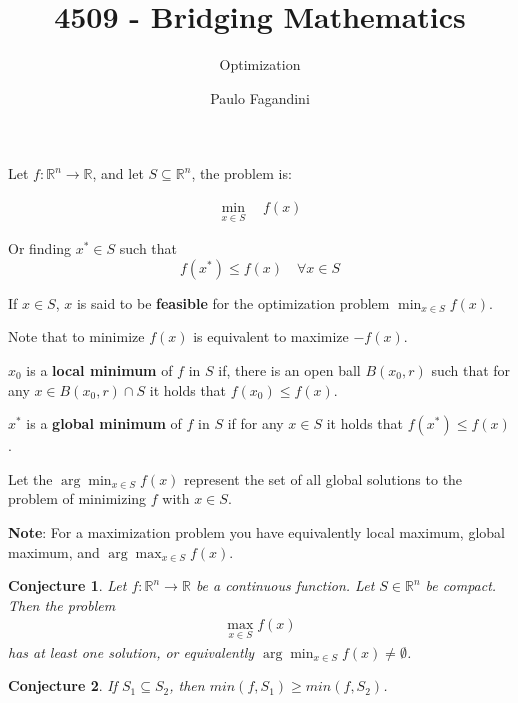 \documentclass[aspectratio=169]{beamer}
\title[]{4509 - Bridging Mathematics}
\subtitle{Optimization}
\author{Paulo Fagandini}
\institute{}
\date{}
\newtheorem{proposition}{Conjecture}[section]
\begin{document}
\begin{frame}
    Let $f:\mathds{R}^n\rightarrow\mathds{R}$, and let $S\subseteq\mathds{R}^n$, the problem is:
    
    \begin{align*}
        \min_{x\in S} \quad f(x)
    \end{align*}
    
    Or finding $x^*\in S$ such that $$f(x^*)\leq f(x) \quad \forall x\in S$$
    
    \begin{definition}
        If $x\in S$, $x$ is said to be \textbf{feasible} for the optimization problem $\min_{x\in S}f(x)$.
    \end{definition}
    \vspace{0.5cm}
    \footnotesize{
    Note that to minimize $f(x)$ is equivalent to maximize $-f(x)$.}
\end{frame}

\begin{frame}
    \begin{definition}
        $x_0$ is a \textbf{local minimum} of $f$ in $S$ if, there is an open ball $B(x_0,r)$ such that for any $x\in B(x_0,r)\cap S$ it holds that $f(x_0)\leq f(x)$.
        
        \vspace{0.25cm}
        
        $x^*$ is a \textbf{global minimum} of $f$ in $S$ if for any $x\in S$ it holds that $f(x^*)\leq f(x)$.
    \end{definition}
    
    \begin{definition}
        Let the $\arg\min_{x\in S} f(x)$ represent the set of all global solutions to the problem of minimizing $f$ with $x\in S$.
    \end{definition}
    
    \vspace{0.5cm}
    
    \footnotesize{
    \textbf{Note}: For a maximization problem you have equivalently local maximum, global maximum, and $\arg\max_{x\in S} f(x)$.}
    
    
\end{frame}

\begin{frame}

\begin{proposition}
    Let $f:\mathds{R}^n\rightarrow\mathds{R}$ be a continuous function. Let $S\in\mathds{R}^n$ be compact. Then the problem
    \begin{align*}
        \max_{x\in S} f(x)
    \end{align*}
    has at least one solution, or equivalently $\arg\min_{x\in S}f(x)\neq\emptyset$.
\end{proposition}

\begin{proposition}
    If $S_1\subseteq S_2$, then $min(f,S_1)\geq min(f,S_2)$.
\end{proposition}
    
\end{frame}
\end{document}
